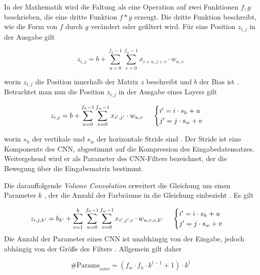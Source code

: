 In der Mathematik wird die Faltung als eine Operation auf zwei Funktionen $f,g$ beschrieben, die eine dritte Funktion $f * g$ erzeugt. Die dritte Funktion beschreibt, wie die Form von $f$ durch $g$ verändert oder gefiltert wird. Für eine Position $ z_{ i,j } $ in der Ausgabe gilt

\begin{equation}
	z_{i,j}=b+\sum_{u=0}^{f_{h}-1}\sum_{v=0}^{f_{w}-1}{x_{i+u,j+v}\cdot w_{u,v}}
\end{equation}

worin $z_{i,j}$ die Position innerhalb der Matrix $z$ beschreibt und $b$ der \gls{Bias} ist \cite[6]{karl2020}. Betrachtet man nun die Position $z_{i,j}$ in der Ausgabe eines Layers gilt 

\begin{equation}
	z_{i,j}=b+\sum_{u=0}^{f_{h}-1}\sum_{v=0}^{f_{w}-1}{x_{i',j'}\cdot w_{u,v}}\text{  \space\space\space    } \begin{cases}
	i' = i \cdot s_{h} + u \\ j' = j \cdot s_{w} + v 
\end{cases}
\end{equation}

worin $s_h$ der vertikale und $s_w$ der horizontale Stride sind \cite[13\psq]{karl2020}. Der Stride ist eine Komponente des \ac{CNN}, abgestimmt auf die Kompression des Eingabedatensatzes. Weitergehend wird er als Parameter des \ac{CNN}-Filters bezeichnet, der die Bewegung  über die Eingabematrix bestimmt.

Die darauffolgende \emph{Volume Convolution} erweitert die Gleichung um einen Parameter $k$ , der die Anzahl der Farbräume in die Gleichung einbezieht \cites[25]{karl2020}[365]{Géron2017}. Es gilt
	
\begin{equation}
	z_{i,j,k'}=b_{k'}+\sum_{c=1}^k{}\sum_{u=0}^{f_{h}-1}\sum_{v=0}^{f_{w}-1}{x_{i',j',c}\cdot w_{u,v,c,k'}}\text{  \space\space\space    } \begin{cases}
	i' = i \cdot s_{h} + u \\ j' = j \cdot s_{w} + v 
\end{cases}
\end{equation}
Die Anzahl der Parameter eines \ac{CNN} ist unabhängig von der Eingabe, jedoch abhängig von der Größe des Filters \cite[28]{karl2020}. Allgemein gilt daher 

\begin{equation}
	\text{\#{ }Params}_{conv} = (f_{w} \cdot f_{h} \cdot k^{l-1} + 1) \cdot k^l
\end{equation}

